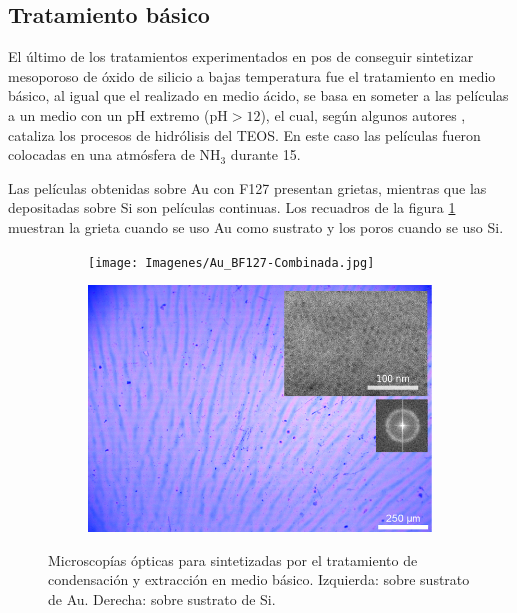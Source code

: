 {	\subsection{Tratamiento básico}

		El último de los tratamientos experimentados en pos de conseguir sintetizar mesoporoso de óxido de silicio a bajas temperatura fue el tratamiento en medio básico, al igual que el realizado en medio ácido, se basa en someter a las películas a un medio con un pH extremo (pH$>12$), el cual, según algunos autores \cite{Soler-Illia2011,Huo1996,Ichinose2002}, cataliza los procesos de hidrólisis del TEOS. En este caso las películas fueron colocadas en una atmósfera de NH$_3$ durante \SI{15}{\min}. 

		Las películas obtenidas sobre Au con F127 presentan grietas, mientras que las depositadas sobre Si son películas continuas. Los recuadros de la figura \ref{fig:Microscopia_F127_basico} muestran la grieta cuando se uso Au como sustrato y los poros cuando se uso Si.

		\begin{figure}[!th]
 	   	    \begin{subfigure}[t]{0.49\textwidth}
	       	\texttt{[image: Imagenes/Au\_BF127-Combinada.jpg]}
	   		\end{subfigure}
	   		\begin{subfigure}[t]{0.49\textwidth}
	   	    \includegraphics[width=\textwidth]{Imagenes/Si_BF127-Combinada.jpg}
	   		\end{subfigure}
			 \caption[Microscopía óptica \pdmF tratamiento en medio básico.]{Microscopías ópticas para \pdmF\space sintetizadas por el tratamiento de condensación y extracción en medio básico. Izquierda: sobre sustrato de Au. Derecha: sobre sustrato de Si.}
			 \label{fig:Microscopia_F127_basico}	
		     \end{figure}	
		
}
